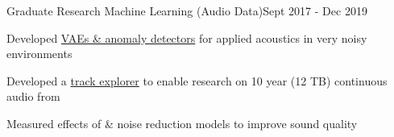 \documentclass{article}
\newenvironment{**mylist}[2]{
  \subsubsection*{#1\hfill#2}
  \small
  \begin{list}{}{}
    \setlength{\topsep}{0pt}
   \setlength{\itemsep}{1pt}
   \setlength{\parskip}{0pt}
   \setlength{\parsep}{0pt}}{\end{list}\normalsize}
\newcommand{\LU}[1]{\hspace{-1em}{\bf Technologies : #1}}
\def\grd{Graduate\xspace}
\begin{document}
\begin{**mylist}{\grd Research \tabb Machine Learning (Audio Data)}{Sept 2017 - Dec 2019}
\item Developed \href{https://github.com/probinso/gumiho-network}{VAEs \& anomaly detectors} for applied  acoustics in very noisy environments %
\item Developed a \href{https://github.com/probinso/ACOio}{track explorer} to enable research on 10 year (12 TB) continuous audio from 
\item Measured effects of  \&  noise reduction models to improve sound quality
\end{**mylist}
\end{document}
